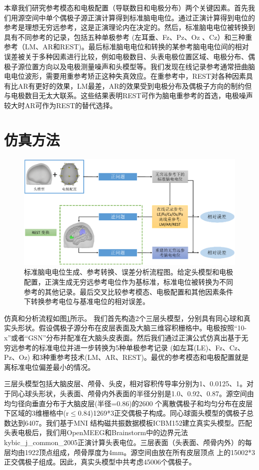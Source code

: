 本章我们研究参考模态和电极配置（导联数目和电极分布）两个关键因素。首先我们用源空间中单个偶极子源正演计算得到标准脑电电位。通过正演计算得到电位的参考是理想无穷远参考，这是正演理论内在决定的。然后，标准脑电电位被转换到具有不同参考的记录，包括五种单极参考 (左耳垂、Fz、Pz、Oz
、Cz）和三种重参考（LM、AR和REST)。最后标准脑电电位和转换的某参考脑电电位间的相对误差被关于多种因素进行比较，例如电极数目、头表电极位置区域、电极分布、偶极子源位置方向以及电极测量噪声和头模型等。我们发现在线记录参考通常扭曲脑电电位波形，需要用重参考矫正这种失真效应。在重参考中，REST对各种因素具有比AR有更好的效果，LM最差，AR的效果受到电极分布及偶极子方向的制约但与电极数目无太大联系。这些结果表明REST可作为脑电重参考的首选，电极噪声较大时AR可作为REST的替代选择。

\section{仿真方法}
\begin{figure}[!ht]
	\includegraphics[width=15cm]{pic/JNE/figure1.png}
	\caption{标准脑电电位生成、参考转换、误差分析流程图。给定头模型和电极配置，正演生成无穷远参考电位作为基标准，标准电位被转换为不同
	参考的其他记录。最后交叉比较参考模态、电极配置和其他因素条件下转换参考电位与基准电位的相对误差。}
	\label{2:pipe}
\end{figure}
仿真和分析流程如图\ref{2:pipe}所示。 我们首先构造2个三层头模型，分别具有同心球和真实头形状。假设偶极子源分布在皮层表面及大脑三维容积栅格中。电极按照“10-x”或者“GSN”分布并配准在大脑头皮表面。然后我们通过正演公式仿真出基于无穷远参考的标准电位并进一步转换为5种单极参考记录 (如左耳(LE)、Fz、Cz、Pz、Oz) 和3种重参考技术(LM、AR、REST)。最优的参考模态和电极配置就是离标准电位偏差最小的情况。

三层头模型包括大脑皮层、颅骨、头皮，相对容积传导率分别为1、0.0125、1。对于同心球头形状，头表面、颅骨内外表面的半径分别是1.0、0.92、0.87。源空间由均匀径向垂直分布于大脑皮层(半径=0.86)的2600
个离散偶极子和均匀分布在皮层下区域的3维栅格中(r$\leq$0.84)1269*3正交偶极子构成。同心球面头模型的偶极子总数达到6407。我们基于MNI
结构磁共振数据模板ICBM152建立真实头模型。匹配头表电极后，我们用OpenMEEG和Brainstorm中的边界元法\citing
{kybic_j_common_2005}正演计算头表电位。三层表面（头表面、颅骨内外）的每层均由1922顶点组成，颅骨厚度为4mm。源空间由放在所有皮层顶点
上的15002*3正交偶极子组成。因此，真实头模型中共考虑45006个偶极子。

